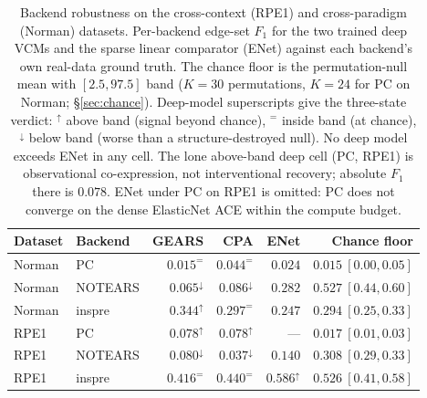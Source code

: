 \documentclass{article}
\theoremstyle{plain}
\theoremstyle{definition}
\theoremstyle{remark}
\begin{document}
\begin{table}[t]
\caption{Backend robustness on the cross-context (RPE1) and cross-paradigm (Norman) datasets. Per-backend edge-set $F_1$ for the two trained deep VCMs and the sparse linear comparator (ENet) against each backend's own real-data ground truth. The chance floor is the permutation-null mean with $[2.5, 97.5]$ band ($K{=}30$ permutations, $K{=}24$ for PC on Norman; \S\ref{sec:chance}). Deep-model superscripts give the three-state verdict: $^{\uparrow}$ above band (signal beyond chance), $^{=}$ inside band (at chance), $^{\downarrow}$ below band (worse than a structure-destroyed null). No deep model exceeds ENet in any cell. The lone above-band deep cell (PC, RPE1) is observational co-expression, not interventional recovery; absolute $F_1$ there is $0.078$. ENet under PC on RPE1 is omitted: PC does not converge on the dense ElasticNet ACE within the compute budget.}
\label{tab:backend}
\vskip 0.1in
\centering
\small
\begin{tabular}{llrrrr}
\toprule
\textbf{Dataset} & \textbf{Backend} & \textbf{GEARS} & \textbf{CPA} & \textbf{ENet} & \textbf{Chance floor} \\
\midrule
Norman & PC      & $0.015^{=}$          & $0.044^{=}$          & $0.024$          & $0.015\ [0.00,0.05]$ \\
Norman & NOTEARS & $0.065^{\downarrow}$ & $0.086^{\downarrow}$ & $0.282$          & $0.527\ [0.44,0.60]$ \\
Norman & inspre  & $0.344^{\uparrow}$   & $0.297^{=}$          & $0.247$          & $0.294\ [0.25,0.33]$ \\
RPE1   & PC      & $0.078^{\uparrow}$   & $0.078^{\uparrow}$   & ---              & $0.017\ [0.01,0.03]$ \\
RPE1   & NOTEARS & $0.080^{\downarrow}$ & $0.037^{\downarrow}$ & $0.140$          & $0.308\ [0.29,0.33]$ \\
RPE1   & inspre  & $0.416^{=}$          & $0.440^{=}$          & $0.586^{\uparrow}$ & $0.526\ [0.41,0.58]$ \\
\bottomrule
\end{tabular}
\vskip -0.1in
\end{table}
\end{document}

